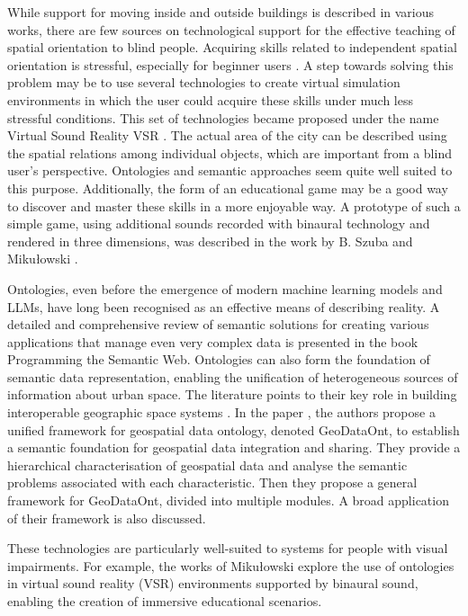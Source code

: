 \documentclass[conference]{IEEEtran}
\begin{document}
While support for moving inside and outside buildings is described in various works, there are few sources on technological support for the effective teaching of spatial orientation to blind people.
Acquiring skills related to independent spatial orientation is stressful, especially for beginner users \cite{Moraes2023DashboardsTS}.
A step towards solving this problem may be to use several technologies to create virtual simulation environments in which the user could acquire these skills under much less stressful conditions.
This set of technologies became proposed under the name Virtual Sound Reality VSR \cite{Mikulowski2017}.
The actual area of the city can be described using the spatial relations among individual objects, which are important from a blind user's perspective.
Ontologies and semantic approaches seem quite well suited to this purpose.
Additionally, the form of an educational game may be a good way to discover and master these skills in a more enjoyable way.
A prototype of such a simple game, using additional sounds recorded with binaural technology and rendered in three dimensions, was described in the work by B. Szuba and Mikułowski \cite{MikulowskiSzuba2025}.

Ontologies, even before the emergence of modern machine learning models and LLMs, have long been recognised as an effective means of describing reality.
A detailed and comprehensive review of semantic solutions for creating various applications that manage even very complex data is presented in the book Programming the Semantic Web.  \cite{segaran2009}
Ontologies can also form the foundation of semantic data representation, enabling the unification of heterogeneous sources of information about urban space. 
The literature points to their key role in building interoperable geographic space systems \cite{Bai2023ASO}.
In the paper \cite{SUN2019}, the authors propose a unified framework for geospatial data ontology, denoted GeoDataOnt, to establish a semantic foundation for geospatial data integration and sharing. 
They provide a hierarchical characterisation of geospatial data and analyse the semantic problems associated with each characteristic. 
Then they propose a general framework for GeoDataOnt, divided into multiple modules.
A broad application of their framework is also discussed.

These technologies are particularly well-suited to systems for people with visual impairments. 
For example, the works of Mikułowski \cite{Mikulowski2017} explore the use of ontologies in virtual sound reality (VSR) environments supported by binaural sound, enabling the creation of immersive educational scenarios.
\end{document}
